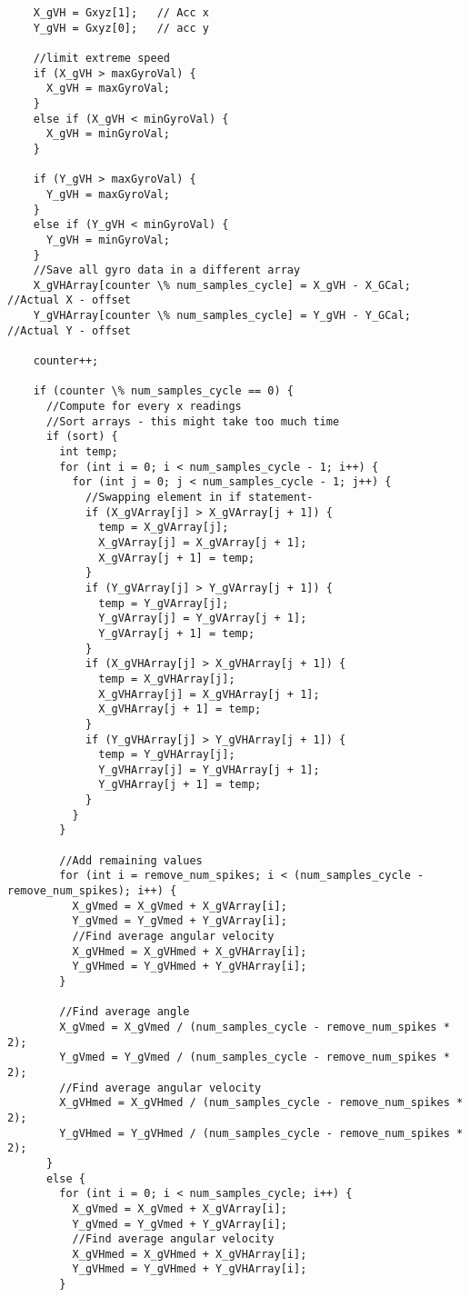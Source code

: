\begin{lstlisting}
    X_gVH = Gxyz[1];   // Acc x
    Y_gVH = Gxyz[0];   // acc y
 
    //limit extreme speed
    if (X_gVH > maxGyroVal) {
      X_gVH = maxGyroVal;
    }
    else if (X_gVH < minGyroVal) {
      X_gVH = minGyroVal;
    }
 
    if (Y_gVH > maxGyroVal) {
      Y_gVH = maxGyroVal;
    }
    else if (Y_gVH < minGyroVal) {
      Y_gVH = minGyroVal;
    }
    //Save all gyro data in a different array
    X_gVHArray[counter \% num_samples_cycle] = X_gVH - X_GCal; //Actual X - offset
    Y_gVHArray[counter \% num_samples_cycle] = Y_gVH - Y_GCal; //Actual Y - offset
 
    counter++;
 
    if (counter \% num_samples_cycle == 0) {
      //Compute for every x readings
      //Sort arrays - this might take too much time
      if (sort) {
        int temp;
        for (int i = 0; i < num_samples_cycle - 1; i++) {
          for (int j = 0; j < num_samples_cycle - 1; j++) {
            //Swapping element in if statement-
            if (X_gVArray[j] > X_gVArray[j + 1]) {
              temp = X_gVArray[j];
              X_gVArray[j] = X_gVArray[j + 1];
              X_gVArray[j + 1] = temp;
            }
            if (Y_gVArray[j] > Y_gVArray[j + 1]) {
              temp = Y_gVArray[j];
              Y_gVArray[j] = Y_gVArray[j + 1];
              Y_gVArray[j + 1] = temp;
            }
            if (X_gVHArray[j] > X_gVHArray[j + 1]) {
              temp = X_gVHArray[j];
              X_gVHArray[j] = X_gVHArray[j + 1];
              X_gVHArray[j + 1] = temp;
            }
            if (Y_gVHArray[j] > Y_gVHArray[j + 1]) {
              temp = Y_gVHArray[j];
              Y_gVHArray[j] = Y_gVHArray[j + 1];
              Y_gVHArray[j + 1] = temp;
            }
          }
        }
 
        //Add remaining values
        for (int i = remove_num_spikes; i < (num_samples_cycle - remove_num_spikes); i++) {
          X_gVmed = X_gVmed + X_gVArray[i];
          Y_gVmed = Y_gVmed + Y_gVArray[i];
          //Find average angular velocity
          X_gVHmed = X_gVHmed + X_gVHArray[i];
          Y_gVHmed = Y_gVHmed + Y_gVHArray[i];
        }
 
        //Find average angle
        X_gVmed = X_gVmed / (num_samples_cycle - remove_num_spikes * 2);
        Y_gVmed = Y_gVmed / (num_samples_cycle - remove_num_spikes * 2);
        //Find average angular velocity
        X_gVHmed = X_gVHmed / (num_samples_cycle - remove_num_spikes * 2);
        Y_gVHmed = Y_gVHmed / (num_samples_cycle - remove_num_spikes * 2);
      }
      else {
        for (int i = 0; i < num_samples_cycle; i++) {
          X_gVmed = X_gVmed + X_gVArray[i];
          Y_gVmed = Y_gVmed + Y_gVArray[i];
          //Find average angular velocity
          X_gVHmed = X_gVHmed + X_gVHArray[i];
          Y_gVHmed = Y_gVHmed + Y_gVHArray[i];
        }
 

\end{lstlisting}
